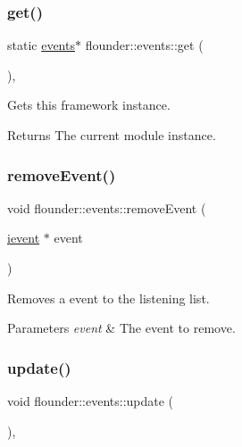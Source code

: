 \subsubsection{\texorpdfstring{get()}{get()}}
{\footnotesize\ttfamily static \hyperlink{classflounder_1_1events}{events}$\ast$ flounder\+::events\+::get (\begin{DoxyParamCaption}{ }\end{DoxyParamCaption})\hspace{0.3cm}{\ttfamily [inline]}, {\ttfamily [static]}}



Gets this framework instance. 

\begin{DoxyReturn}{Returns}
The current module instance. 
\end{DoxyReturn}
\mbox{\label{classflounder_1_1events_a957a88d282b2caa50cc87bbe039de095}} 
\subsubsection{\texorpdfstring{remove\+Event()}{removeEvent()}}
{\footnotesize\ttfamily void flounder\+::events\+::remove\+Event (\begin{DoxyParamCaption}\item[{\hyperlink{classflounder_1_1ievent}{ievent} $\ast$}]{event }\end{DoxyParamCaption})}



Removes a event to the listening list. 


\begin{DoxyParams}{Parameters}
{\em event} & The event to remove. \\
\hline
\end{DoxyParams}
\mbox{\label{classflounder_1_1events_a7fc08fdb5dc615a924dd0d55996747dc}} 
\subsubsection{\texorpdfstring{update()}{update()}}
{\footnotesize\ttfamily void flounder\+::events\+::update (\begin{DoxyParamCaption}{ }\end{DoxyParamCaption})\hspace{0.3cm}{\ttfamily [override]}, {\ttfamily [virtual]}}




